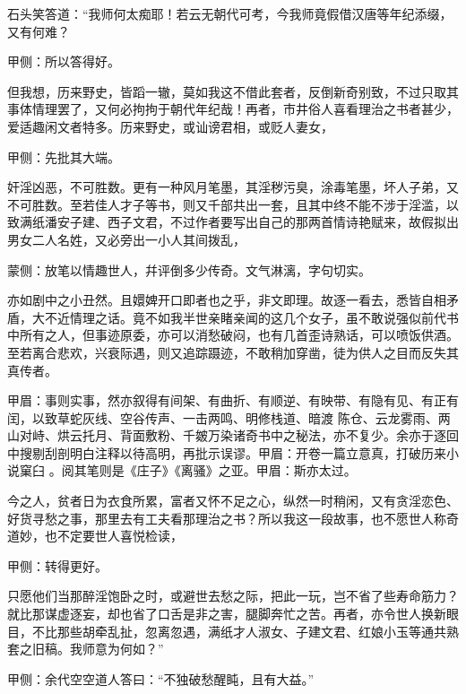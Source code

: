 \begin{parag}
    石头笑答道：“我师何太痴耶！若云无朝代可考，今我师竟假借汉唐等年纪添缀，又有何难？\begin{note}甲侧：所以答得好。\end{note}但我想，历来野史，皆蹈一辙，莫如我这不借此套者，反倒新奇别致，不过只取其事体情理罢了，又何必拘拘于朝代年纪哉！再者，市井俗人喜看理治之书者甚少，爱适趣闲文者特多。历来野史，或讪谤君相，或贬人妻女，\begin{note}甲侧：先批其大端。\end{note}奸淫凶恶，不可胜数。更有一种风月笔墨，其淫秽污臭，涂毒笔墨，坏人子弟，又不可胜数。至若佳人才子等书，则又千部共出一套，且其中终不能不涉于淫滥，以致满纸潘安子建、西子文君，不过作者要写出自己的那两首情诗艳赋来，故假拟出男女二人名姓，又必旁出一小人其间拨乱，\begin{note}蒙侧：放笔以情趣世人，幷评倒多少传奇。文气淋漓，字句切实。\end{note}亦如剧中之小丑然。且嬛婢开口即者也之乎，非文即理。故逐一看去，悉皆自相矛盾，大不近情理之话。竟不如我半世亲睹亲闻的这几个女子，虽不敢说强似前代书中所有之人，但事迹原委，亦可以消愁破闷，也有几首歪诗熟话，可以喷饭供酒。至若离合悲欢，兴衰际遇，则又追踪蹑迹，不敢稍加穿凿，徒为供人之目而反失其真传者。\begin{note}甲眉：事则实事，然亦叙得有间架、有曲折、有顺逆、有映带、有隐有见、有正有闰，以致草蛇灰线、空谷传声、一击两鸣、明修栈道、暗渡 陈仓、云龙雾雨、两山对峙、烘云托月、背面敷粉、千皴万染诸奇书中之秘法，亦不复少。余亦于逐回中搜剔刮剖明白注释以待高明，再批示误谬。甲眉：开卷一篇立意真，打破历来小说窠臼 。阅其笔则是《庄子》《离骚》之亚。甲眉：斯亦太过。\end{note}今之人，贫者日为衣食所累，富者又怀不足之心，纵然一时稍闲，又有贪淫恋色、好货寻愁之事，那里去有工夫看那理治之书？所以我这一段故事，也不愿世人称奇道妙，也不定要世人喜悦检读，\begin{note}甲侧：转得更好。\end{note}只愿他们当那醉淫饱卧之时，或避世去愁之际，把此一玩，岂不省了些寿命筋力？就比那谋虚逐妄，却也省了口舌是非之害，腿脚奔忙之苦。再者，亦令世人换新眼目，不比那些胡牵乱扯，忽离忽遇，满纸才人淑女、子建文君、红娘小玉等通共熟套之旧稿。我师意为何如？”\begin{note}甲侧：余代空空道人答曰：“不独破愁醒盹，且有大益。”\end{note}
\end{parag}


